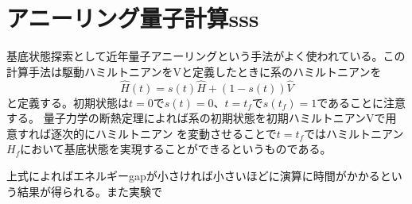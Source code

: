 \section{アニーリング量子計算sss}
基底状態探索として近年量子アニーリングという手法がよく使われている。この計算手法は駆動ハミルトニアンをVと定義したときに系のハミルトニアンを
\begin{equation}
    \hat{H}(t) = s(t) \hat{H} +(1-s(t))\hat{V}
\end{equation}
と定義する。初期状態は$t=0$で$s(t)=0$、$t=t_f$で$s(t_f)=1$であることに注意する。
量子力学の断熱定理によれば系の初期状態を初期ハミルトニアンVで用意すれば逐次的にハミルトニアン
を変動させることで$t=t_f$ではハミルトニアン$H_f$において基底状態を実現することができるというものである。

上式によればエネルギーgapが小さければ小さいほどに演算に時間がかかるという結果が得られる。また実験で